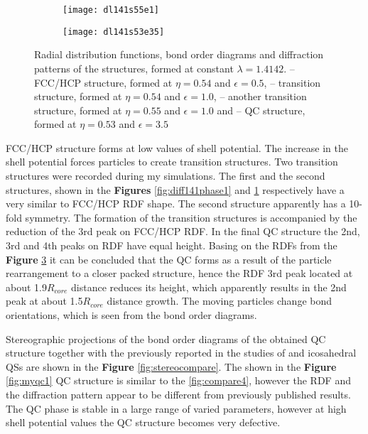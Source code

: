 \begin{figure}
\begin{subfigure}{.24\textwidth}
  \centering
  \texttt{[image: dl141s55e1]}
  \caption{}
  \label{fig:diff141phase2} 
\end{subfigure}
\begin{subfigure}{.24\textwidth}
  \centering
  \texttt{[image: dl141s53e35]}
  \caption{}
  \label{fig:diff141qc} 
\end{subfigure}
\caption{Radial distribution functions, bond order diagrams and diffraction patterns of the structures, formed at  constant $\lambda=1.4142$.  -- FCC/HCP structure, formed at $\eta=0.54$ and $\epsilon=0.5$,  -- transition structure, formed at $\eta=0.54$ and $\epsilon=1.0$,  -- another transition structure, formed at $\eta=0.55$ and $\epsilon=1.0$ and  -- QC structure, formed at $\eta=0.53$ and $\epsilon=3.5$}
\label{fig:evolution141}
\end{figure}

FCC/HCP structure forms at low values of shell potential. The increase in the shell potential forces particles to create transition structures. Two transition structures were recorded during my simulations. The first and the second structures, shown in the \textbf{Figures} \ref{fig:diff141phase1} and  \ref{fig:diff141phase2} respectively have a very similar to FCC/HCP RDF shape. The second structure apparently has a 10-fold symmetry. The formation of the transition structures is accompanied by the reduction of the 3rd peak on FCC/HCP RDF. In the final QC structure the 2nd, 3rd and 4th peaks on RDF have equal height. Basing on the RDFs from the \textbf{Figure} \ref{fig:evolution141} it can be concluded that the QC forms as a result of the particle rearrangement to a closer packed structure, hence the RDF 3rd peak located at about 1.9$R_{core}$ distance reduces its height, which apparently results in the 2nd peak at about 1.5$R_{core}$ distance growth. The moving particles change bond orientations, which is seen from the bond order diagrams. 


Stereographic projections of the bond order diagrams of the obtained QC structure together with the previously reported in the studies of %
\citet{methods} and %
\citet{compareicos} icosahedral QSs are shown in the \textbf{Figure} \ref{fig:stereocompare}. 
The shown in the \textbf{Figure} \ref{fig:myqc1} %
QC structure is similar to the \ref{fig:compare4}, however the RDF and the diffraction pattern appear to be different from previously published results. The QC phase is stable in a large range of varied parameters, however at high shell potential values the QC structure becomes very defective. 

